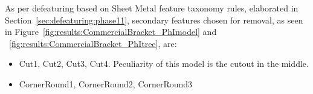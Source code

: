 
%
%
%

As per defeaturing based on Sheet Metal feature taxonomy rules, elaborated in Section~\ref{sec:defeaturing:phase11}, secondary features chosen for removal, as seen in Figure~\ref{fig:results:CommercialBracket_PhImodel} and ~\ref{fig:results:CommercialBracket_PhItree}, are:

\begin{itemize}[noitemsep,topsep=2pt,parsep=2pt,partopsep=2pt]
\item Cut1, Cut2, Cut3, Cut4. Peculiarity of this model is the cutout in the middle. 
\item CornerRound1, CornerRound2, CornerRound3
\end{itemize}




